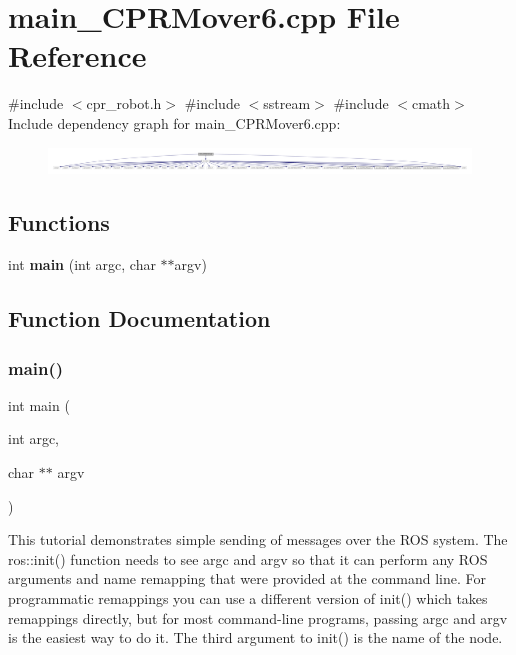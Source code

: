 \section{main\+\_\+\+C\+P\+R\+Mover6.\+cpp File Reference}
\label{main__CPRMover6_8cpp}
{\ttfamily \#include $<$cpr\+\_\+robot.\+h$>$}\newline
{\ttfamily \#include $<$sstream$>$}\newline
{\ttfamily \#include $<$cmath$>$}\newline
Include dependency graph for main\+\_\+\+C\+P\+R\+Mover6.\+cpp\+:
\nopagebreak
\begin{figure}[H]
\begin{center}
\leavevmode
\includegraphics[width=350pt]{main__CPRMover6_8cpp__incl}
\end{center}
\end{figure}
\subsection*{Functions}
\begin{DoxyCompactItemize}
\item 
int \textbf{ main} (int argc, char $\ast$$\ast$argv)
\end{DoxyCompactItemize}


\subsection{Function Documentation}
\mbox{\label{main__CPRMover6_8cpp_a3c04138a5bfe5d72780bb7e82a18e627}} 
\subsubsection{main()}
{\footnotesize\ttfamily int main (\begin{DoxyParamCaption}\item[{int}]{argc,  }\item[{char $\ast$$\ast$}]{argv }\end{DoxyParamCaption})}

This tutorial demonstrates simple sending of messages over the R\+OS system. The ros\+::init() function needs to see argc and argv so that it can perform any R\+OS arguments and name remapping that were provided at the command line. For programmatic remappings you can use a different version of init() which takes remappings directly, but for most command-\/line programs, passing argc and argv is the easiest way to do it. The third argument to init() is the name of the node.

